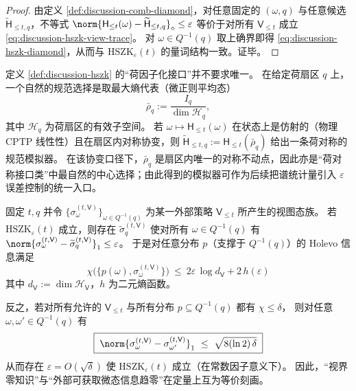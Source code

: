 \begin{proof}
由定义 \ref{def:discussion-comb-diamond}，对任意固定的 \((\omega,q)\) 与任意候选 \(\widetilde{\mathsf{H}}_{\le t,q}\)，不等式
\(
\norm{\mathsf{H}_{\le t}(\omega)-\widetilde{\mathsf{H}}_{\le t,q}}_\diamond\le \varepsilon
\)
等价于对所有 \(\mathsf{V}_{\le t}\) 成立 \eqref{eq:discussion-hszk-view-trace}。
对 \(\omega\in Q^{-1}(q)\) 取上确界即得 \eqref{eq:discussion-hszk-diamond}，从而与 \(\mathrm{HSZK}_\varepsilon(t)\) 的量词结构一致。证毕。
\end{proof}

\begin{remark}\label{rem:discussion-canonical-simulator-microcanonical}
定义 \ref{def:discussion-hszk} 的“荷因子化接口”并不要求唯一。
在给定荷扇区 \(q\) 上，一个自然的规范选择是取最大熵代表（微正则平均态）
\[
\bar\rho_q:=\frac{I_q}{\dim\mathcal{H}_q},
\]
其中 \(\mathcal{H}_q\) 为荷扇区的有效子空间。
若 \(\omega\mapsto \mathsf{H}_{\le t}(\omega)\) 在状态上是仿射的（物理 CPTP 线性性）且在扇区内对称协变，则
\(\widetilde{\mathsf{H}}_{\le t,q}:=\mathsf{H}_{\le t}(\bar\rho_q)\)
给出一条荷对称的规范模拟器。
在该协变口径下，\(\bar\rho_q\) 是扇区内唯一的对称不动点，因此亦是“荷对称接口类”中最自然的中心选择；由此得到的模拟器可作为后续把谱统计量引入 \(\varepsilon\) 误差控制的统一入口。
\end{remark}

\begin{proposition}\label{prop:discussion-hszk-holevo}
固定 \(t,q\) 并令 \(\{\sigma^{(t,\mathsf{V})}_\omega\}_{\omega\in Q^{-1}(q)}\) 为某一外部策略 \(\mathsf{V}_{\le t}\) 所产生的视图态族。
若 \(\mathrm{HSZK}_\varepsilon(t)\) 成立，则存在 \(\widetilde{\sigma}^{(t,\mathsf{V})}_q\) 使对所有 \(\omega\in Q^{-1}(q)\) 有 \(\norm{\sigma^{(t,\mathsf{V})}_\omega-\widetilde{\sigma}^{(t,\mathsf{V})}_q}_1\le \varepsilon\)。
于是对任意分布 \(p\)（支撑于 \(Q^{-1}(q)\)）的 Holevo 信息满足
\begin{equation}\label{eq:discussion-holevo-upper}
\boxed{\;
\chi\bigl(\{p(\omega),\sigma^{(t,\mathsf{V})}_\omega\}\bigr)
\ \le\
2\varepsilon\,\log d_{\mathsf{V}}+2\,h(\varepsilon)\;}
\end{equation}
其中 \(d_{\mathsf{V}}:=\dim\mathcal{H}_{\mathsf{V}}\)，\(h\) 为二元熵函数。
\par
反之，若对所有允许的 \(\mathsf{V}_{\le t}\) 与所有分布 \(p\subseteq Q^{-1}(q)\) 都有 \(\chi\le \delta\)，
则对任意 \(\omega,\omega'\in Q^{-1}(q)\) 有
\begin{equation}\label{eq:discussion-holevo-reverse}
\boxed{\;
\norm{\sigma^{(t,\mathsf{V})}_\omega-\sigma^{(t,\mathsf{V})}_{\omega'}}_1
\ \le\
\sqrt{8(\ln 2)\,\delta}\;}
\end{equation}
从而存在 \(\varepsilon=O(\sqrt{\delta})\) 使 \(\mathrm{HSZK}_\varepsilon(t)\) 成立（在常数因子意义下）。
因此，“视界零知识”与“外部可获取微态信息趋零”在定量上互为等价刻画。
\end{proposition}

